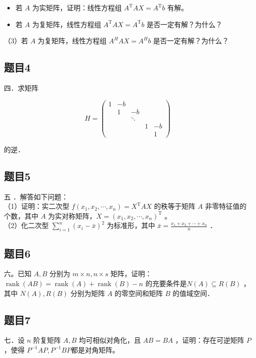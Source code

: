\documentclass{article}
\begin{document}
\begin{itemize}
  \item[（1）] 若 \(A\) 为实矩阵，证明：线性方程组 \(A^{\mathrm{T}} A X=A^{\mathrm{T}} b\) 有解。
  \item[（2）] 若 \(A\) 为复矩阵，线性方程组 \(A^{\mathrm{T}} A X=A^{\mathrm{T}} b\) 是否一定有解？为什么？
\end{itemize}

（3）若 \(A\) 为复矩阵，线性方程组 \(A^{H} A X=A^{H} b\) 是否一定有解？为什么？

\subsection{题目4}
四．求矩阵

\[
H=\left(\begin{array}{ccccc}
1 & -b & & & \\
& 1 & -b & & \\
& & \ddots & & \\
& & & 1 & -b \\
& & & & 1
\end{array}\right)
\]

的逆．

\subsection{题目5}
五 ．解答如下问题：\\
（1）证明：实二次型 \(f\left(x_{1}, x_{2}, \cdots, x_{n}\right)=X^{\mathrm{T}} A X\) 的秩等于矩阵 \(A\) 非零特征值的个数，其中 \(A\) 为实对称矩阵，\(X=\left(x_{1}, x_{2}, \cdots, x_{n}\right)^{\mathrm{T}}\) 。\\
（2）化二次型 \(\sum_{i=1}^{n}\left(x_{i}-\bar{x}\right)^{2}\) 为标准形，其中 \(\bar{x}=\frac{x_{1}+x_{2}+\cdots+x_{n}}{n}\) ．

\subsection{题目6}
六。已知 \(A, B\) 分别为 \(m \times n, n \times s\) 矩阵，证明： \(\operatorname{rank}(A B)=\operatorname{rank}(A)+\operatorname{rank}(B)-n\) 的充要条件是\(N(A) \subseteq R(B)\) ，其中 \(N(A), R(B)\) 分别为矩阵 \(A\) 的零空间和矩阵 \(B\) 的值域空间．

\subsection{题目7}
七．设 \(n\) 阶复矩阵 \(A, B\) 均可相似对角化，且 \(A B=B A\) ，证明：存在可逆矩阵 \(P\) ，使得 \(P^{-1} A P, P^{-1} B P\)都是对角矩阵。
\end{document}
